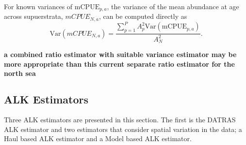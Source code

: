 \documentclass[a4paper 12pt]{article}
\numberwithin{equation}{section}
\begin{document}
\noindent For known variances of  $\mathrm{mCPUE}_{p,a} $, the variance of the mean abundance at age across supuerstrata,  $mCPUE_{N,a}$, can be computed directly as 
\begin{equation}
\mathrm{Var} \left(mCPUE_{N,a}\right) =  \frac{\sum_{p=1}^{P} {A}_{p}^{2}  \mathrm{Var}\left(\mathrm{mCPUE}_{p,a} \right)}{\displaystyle{A}_{N}^{2}}.
\end{equation}

{\bf a combined ratio estimator with suitable variance estimator may be more appropriate than this current separate ratio estimator for the north sea}





\subsection{ALK Estimators}

Three ALK estimators are presented in this section. The first is the DATRAS ALK estimator and two estimators that consider spatial variation in the data; a Haul based ALK estimator and a Model based ALK estimator.
\end{document}
